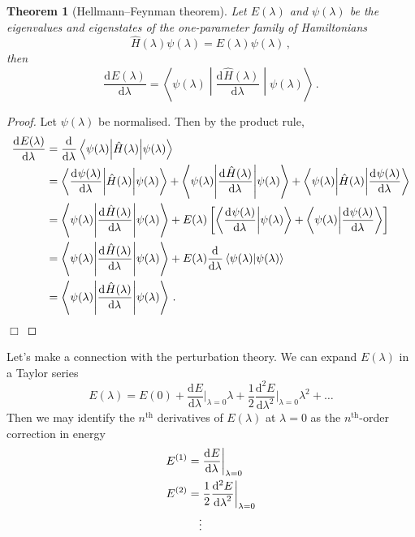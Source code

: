 \documentclass{article}
\theoremstyle{plain}\theoremheaderfont{\normalfont\itshape}\theorembodyfont{\rmfamily}\theoremseparator{.}\newtheorem*{rem}{Remark}\newtheorem*{ex}{Example}\newtheorem*{proof}{Proof}\newtheorem*{altp}{Alternative proof}
\theoremstyle{plain}\theoremheaderfont{\normalfont\bfseries}\theorembodyfont{\rmfamily}\theoremseparator{.}\newtheorem{thm}{Theorem}[section]\newtheorem{lem}[thm]{Lemma}\newtheorem{prop}[thm]{Proposition}\newtheorem*{cor}{Corollary}\newtheorem{defn}[thm]{Definition}\newtheorem{clm}[thm]{Claim}\newtheorem{clminproof}{Claim}
\theoremstyle{break}\theoremheaderfont{\normalfont\itshape}\theorembodyfont{\rmfamily}\theoremseparator{.\medskip}\newtheorem*{proofskip}{Proof}\newtheorem*{exs}{Examples}\newtheorem*{rems}{Remarks}
\theoremstyle{break}\theoremheaderfont{\normalfont\bfseries}\theorembodyfont{\rmfamily}\theoremseparator{.\medskip}\newtheorem{lemskip}[thm]{Lemma}\newtheorem{defnskip}[thm]{Definition}\newtheorem{propskip}[thm]{Proposition}\newtheorem{thmskip}[thm]{Theorem}
\numberwithin{equation}{section}
\newcommand{\qed}{\hfill\ensuremath{\Box}}
\newcommand{\dv}[3][]{\frac{\mathrm{d}^{#1} #2}{{\mathrm{d} #3}^{#1}}}
\newcommand{\braket}[2]{\left\langle #1 \middle| #2 \right\rangle}
\newcommand{\mel}[3]{\left\langle #1 \middle| #2 \middle| #3 \right\rangle}
\newcommand{\expval}[2]{\left\langle #2 \middle| #1 \middle| #2 \right\rangle}
\begin{document}
    \begin{thm}[Hellmann--Feynman theorem]
        Let \(E(\lambda)\) and \(\psi(\lambda)\) be the eigenvalues and eigenstates of the one-parameter family of Hamiltonians
        \begin{equation}
            \hat{H}(\lambda)\psi(\lambda)=E(\lambda)\psi(\lambda)\,,
        \end{equation}
        then
        \begin{equation}
            \dv{E(\lambda)}{\lambda}=\expval{\dv{\hat{H}(\lambda)}{\lambda}}{\psi(\lambda)}\,.
        \end{equation}
    \end{thm}
    \begin{proof}
        Let \(\psi(\lambda)\) be normalised. Then by the product rule,
        \begin{align}
            \dv{E(\lambda)}{\lambda}&=\dv{}{\lambda}\expval{\hat{H}(\lambda)}{\psi(\lambda)}\notag \\
            &=\mel{\dv{\psi(\lambda)}{\lambda}}{\hat{H}(\lambda)}{\psi(\lambda)}+\expval{\dv{\hat{H}(\lambda)}{\lambda}}{\psi(\lambda)}+\mel{\psi(\lambda)}{\hat{H}(\lambda)}{\dv{\psi(\lambda)}{\lambda}}\notag\\
            &=\expval{\dv{\hat{H}(\lambda)}{\lambda}}{\psi(\lambda)}+E(\lambda)\left[\braket{\dv{\psi(\lambda)}{\lambda}}{\psi(\lambda)}+\braket{\psi(\lambda)}{\dv{\psi(\lambda)}{\lambda}}\right]\notag \\
            &=\expval{\dv{\hat{H}(\lambda)}{\lambda}}{\psi(\lambda)}+E(\lambda)\dv{}{\lambda}\braket{\psi(\lambda)}{\psi(\lambda)}\notag\\
            &=\expval{\dv{\hat{H}(\lambda)}{\lambda}}{\psi(\lambda)}\,.
        \end{align}\qed
    \end{proof}

    Let's make a connection with the perturbation theory. We can expand \(E(\lambda)\) in a Taylor series
    \begin{equation}
        E(\lambda)=E(0)+\dv{E}{\lambda}\bigg|_{\lambda=0}\lambda+\frac{1}{2}\dv[2]{E}{\lambda}\bigg|_{\lambda=0}\lambda^2+\dots
    \end{equation}
    Then we may identify the \(n^{\text{th}}\) derivatives of \(E(\lambda)\) at \(\lambda=0\) as the \(n^{\text{th}}\)-order correction in energy
    \begin{align}
        E^{(1)}&=\dv{E}{\lambda}\bigg|_{\lambda=0}\\
        E^{(2)}&=\frac{1}{2}\dv[2]{E}{\lambda}\bigg|_{\lambda=0}\\
        &\quad\vdots\notag
    \end{align}
\end{document}
